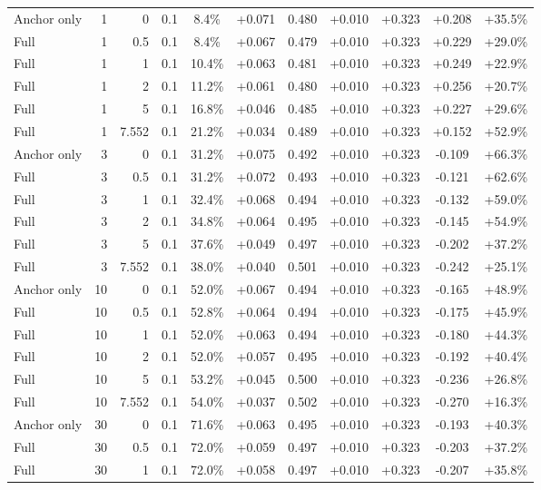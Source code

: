 \begin{table}[htbp]
\begin{tabular}{lrrrccccccc}
Anchor only & 1 & 0 & 0.1 & 8.4\% & +0.071 & 0.480 & +0.010 & +0.323 & +0.208 & +35.5\% \\
Full & 1 & 0.5 & 0.1 & 8.4\% & +0.067 & 0.479 & +0.010 & +0.323 & +0.229 & +29.0\% \\
Full & 1 & 1 & 0.1 & 10.4\% & +0.063 & 0.481 & +0.010 & +0.323 & +0.249 & +22.9\% \\
Full & 1 & 2 & 0.1 & 11.2\% & +0.061 & 0.480 & +0.010 & +0.323 & +0.256 & +20.7\% \\
Full & 1 & 5 & 0.1 & 16.8\% & +0.046 & 0.485 & +0.010 & +0.323 & +0.227 & +29.6\% \\
Full & 1 & 7.552 & 0.1 & 21.2\% & +0.034 & 0.489 & +0.010 & +0.323 & +0.152 & +52.9\% \\
Anchor only & 3 & 0 & 0.1 & 31.2\% & +0.075 & 0.492 & +0.010 & +0.323 & -0.109 & +66.3\% \\
Full & 3 & 0.5 & 0.1 & 31.2\% & +0.072 & 0.493 & +0.010 & +0.323 & -0.121 & +62.6\% \\
Full & 3 & 1 & 0.1 & 32.4\% & +0.068 & 0.494 & +0.010 & +0.323 & -0.132 & +59.0\% \\
Full & 3 & 2 & 0.1 & 34.8\% & +0.064 & 0.495 & +0.010 & +0.323 & -0.145 & +54.9\% \\
Full & 3 & 5 & 0.1 & 37.6\% & +0.049 & 0.497 & +0.010 & +0.323 & -0.202 & +37.2\% \\
Full & 3 & 7.552 & 0.1 & 38.0\% & +0.040 & 0.501 & +0.010 & +0.323 & -0.242 & +25.1\% \\
Anchor only & 10 & 0 & 0.1 & 52.0\% & +0.067 & 0.494 & +0.010 & +0.323 & -0.165 & +48.9\% \\
Full & 10 & 0.5 & 0.1 & 52.8\% & +0.064 & 0.494 & +0.010 & +0.323 & -0.175 & +45.9\% \\
Full & 10 & 1 & 0.1 & 52.0\% & +0.063 & 0.494 & +0.010 & +0.323 & -0.180 & +44.3\% \\
Full & 10 & 2 & 0.1 & 52.0\% & +0.057 & 0.495 & +0.010 & +0.323 & -0.192 & +40.4\% \\
Full & 10 & 5 & 0.1 & 53.2\% & +0.045 & 0.500 & +0.010 & +0.323 & -0.236 & +26.8\% \\
Full & 10 & 7.552 & 0.1 & 54.0\% & +0.037 & 0.502 & +0.010 & +0.323 & -0.270 & +16.3\% \\
Anchor only & 30 & 0 & 0.1 & 71.6\% & +0.063 & 0.495 & +0.010 & +0.323 & -0.193 & +40.3\% \\
Full & 30 & 0.5 & 0.1 & 72.0\% & +0.059 & 0.497 & +0.010 & +0.323 & -0.203 & +37.2\% \\
Full & 30 & 1 & 0.1 & 72.0\% & +0.058 & 0.497 & +0.010 & +0.323 & -0.207 & +35.8\% \\

\end{tabular}
\end{table}
